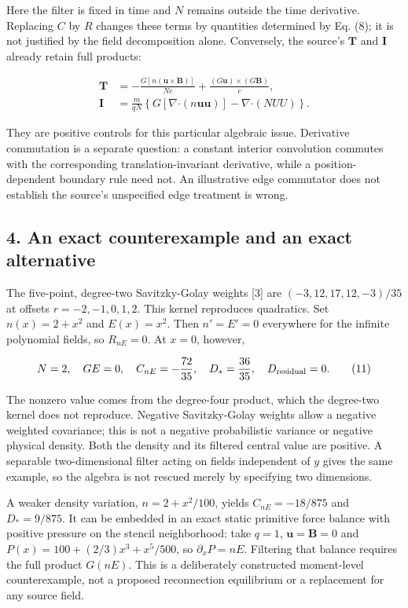 Here the filter is fixed in time and \(N\) remains outside the time
derivative. Replacing \(C\) by \(R\) changes these terms by quantities
determined by Eq. (8); it is not justified by the field decomposition
alone. Conversely, the source's \(\boldsymbol T\) and \(\boldsymbol I\)
already retain full products:

\[
\begin{aligned}
\boldsymbol T&=-\frac{G[n(\boldsymbol u\times\boldsymbol B)]}{Nc}
+\frac{(G\boldsymbol u)\times(G\boldsymbol B)}c,\\
\boldsymbol I&=\frac{m}{qN}\left\{
G[\nabla\boldsymbol{\cdot}(n\boldsymbol u\boldsymbol u)]
-\nabla\boldsymbol{\cdot}(NUU)\right\}.
\end{aligned}\tag{10}
\]

They are positive controls for this particular algebraic issue.
Derivative commutation is a separate question: a constant interior
convolution commutes with the corresponding translation-invariant
derivative, while a position-dependent boundary rule need not. An
illustrative edge commutator does not establish the source's unspecified
edge treatment is wrong.

\subsection{4. An exact counterexample and an exact
alternative}\label{an-exact-counterexample-and-an-exact-alternative}

The five-point, degree-two Savitzky-Golay weights {[}3{]} are
\((-3,12,17,12,-3)/35\) at offsets \(r=-2,-1,0,1,2\). This kernel
reproduces quadratics. Set \(n(x)=2+x^2\) and \(E(x)=x^2\). Then
\(n'=E'=0\) everywhere for the infinite polynomial fields, so
\(R_{nE}=0\). At \(x=0\), however,

\[
N=2,\quad GE=0,\quad C_{nE}=-\frac{72}{35},
\quad D_*=\frac{36}{35},\quad D_{\rm residual}=0.\tag{11}
\]

The nonzero value comes from the degree-four product, which the
degree-two kernel does not reproduce. Negative Savitzky-Golay weights
allow a negative weighted covariance; this is not a negative
probabilistic variance or negative physical density. Both the density
and its filtered central value are positive. A separable two-dimensional
filter acting on fields independent of \(y\) gives the same example, so
the algebra is not rescued merely by specifying two dimensions.

A weaker density variation, \(n=2+x^2/100\), yields \(C_{nE}=-18/875\)
and \(D_*=9/875\). It can be embedded in an exact static primitive force
balance with positive pressure on the stencil neighborhood: take
\(q=1\), \(\boldsymbol u=\boldsymbol B=0\) and
\(P(x)=100+(2/3)x^3+x^5/500\), so \(\partial_xP=nE\). Filtering that
balance requires the full product \(G(nE)\). This is a deliberately
constructed moment-level counterexample, not a proposed reconnection
equilibrium or a replacement for any source field.

